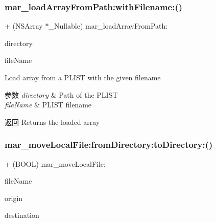 \subsubsection{\texorpdfstring{mar\+\_\+load\+Array\+From\+Path\+:with\+Filename\+:()}{mar\_loadArrayFromPath:withFilename:()}}
{\footnotesize\ttfamily + (N\+S\+Array $\ast$\+\_\+\+Nullable) mar\+\_\+load\+Array\+From\+Path\+: \begin{DoxyParamCaption}\item[{(M\+A\+R\+Directory\+Type)}]{directory }\item[{withFilename:(N\+S\+String $\ast$ \+\_\+\+Nonnull)}]{file\+Name }\end{DoxyParamCaption}}

Load array from a P\+L\+I\+ST with the given filename


\begin{DoxyParams}{参数}
{\em directory} & Path of the P\+L\+I\+ST \\
\hline
{\em file\+Name} & P\+L\+I\+ST filename\\
\hline
\end{DoxyParams}
\begin{DoxyReturn}{返回}
Returns the loaded array 
\end{DoxyReturn}
\mbox{\label{category_n_s_file_manager_07_m_a_r_e_x_08_af00a05aea9bfaf3e97d84a3c30beb1bd}} 
\subsubsection{\texorpdfstring{mar\+\_\+move\+Local\+File\+:from\+Directory\+:to\+Directory\+:()}{mar\_moveLocalFile:fromDirectory:toDirectory:()}}
{\footnotesize\ttfamily + (B\+O\+OL) mar\+\_\+move\+Local\+File\+: \begin{DoxyParamCaption}\item[{(N\+S\+String $\ast$ \+\_\+\+Nonnull)}]{file\+Name }\item[{fromDirectory:(M\+A\+R\+Directory\+Type)}]{origin }\item[{toDirectory:(M\+A\+R\+Directory\+Type)}]{destination }\end{DoxyParamCaption}}


